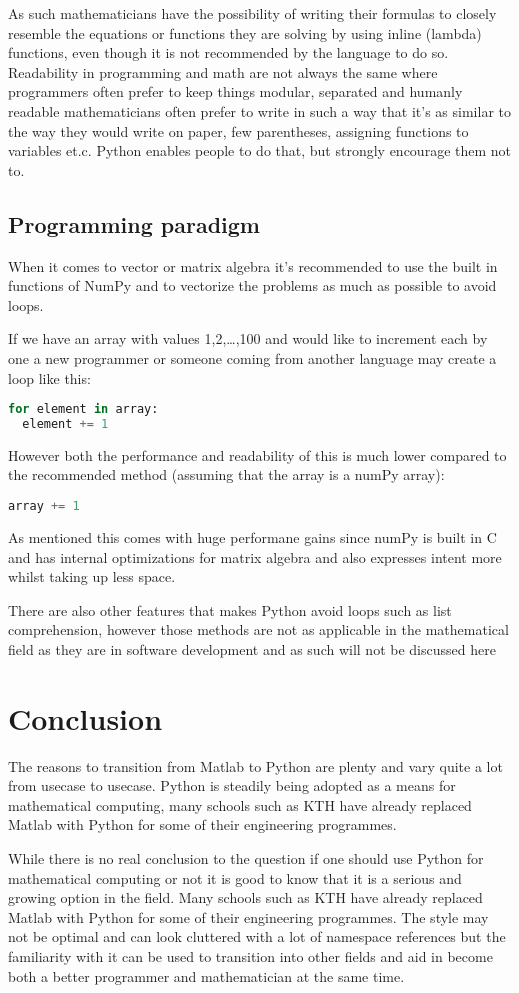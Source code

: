 \documentclass{article}
\begin{document}
As such mathematicians have the possibility of writing their formulas to closely resemble the equations or functions they are solving
by using inline (lambda) functions, even though it is not recommended by the language to do so. Readability in programming and math are
not always the same where programmers often prefer to keep things modular, separated and humanly readable mathematicians often prefer
to write in such a way that it's as similar to the way they would write on paper, few parentheses, assigning functions to variables et.c.
Python enables people to do that, but strongly encourage them not to.

\subsection{Programming paradigm}
When it comes to vector or matrix algebra it's recommended to use the built in functions of NumPy and to vectorize the problems
as much as possible to avoid loops.

If we have an array with values 1,2,\ldots,100 and would like to increment each by one a new programmer or someone coming from another
language may create a loop like this:
\begin{lstlisting}[language=Python]
for element in array:
  element += 1
\end{lstlisting}
However both the performance and readability of this is much lower compared to the recommended method (assuming that the array is a
numPy array):
\begin{lstlisting}[language=Python]
array += 1
\end{lstlisting}

As mentioned this comes with huge performane gains since numPy is built in C and has internal optimizations for matrix algebra and also
expresses intent more whilst taking up less space.

There are also other features that makes Python avoid loops such as list comprehension, however those methods are not as applicable
in the mathematical field as they are in software development and as such will not be discussed here




\section{Conclusion}%
The reasons to transition from Matlab to Python are plenty and vary quite a lot from usecase to usecase. 
Python is steadily being adopted as a means for mathematical computing, 
many schools such as KTH have already replaced Matlab with Python for some of their engineering programmes.

While there is no real conclusion to the question if one should use Python for mathematical computing or not it is good to know that
it is a serious and growing option in the field. Many schools such as KTH have already replaced Matlab with Python for some of their
engineering programmes. The style may not be optimal and can look cluttered with a lot of namespace references but the familiarity with
it can be used to transition into other fields and aid in become both a better programmer and mathematician at the same time.
\end{document}

